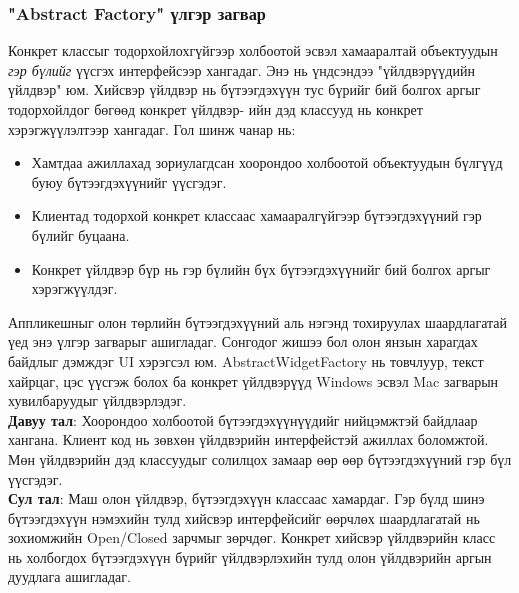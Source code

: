 \subsubsection{"Abstract Factory" үлгэр загвар}
\quad \quad Конкрет классыг тодорхойлохгүйгээр холбоотой эсвэл хамааралтай объектуудын \textit{гэр бүлийг} үүсгэх интерфейсээр хангадаг. Энэ нь үндсэндээ "үйлдвэрүүдийн үйлдвэр" юм. Хийсвэр үйлдвэр нь бүтээгдэхүүн тус бүрийг бий болгох аргыг тодорхойлдог бөгөөд конкрет үйлдвэр- ийн дэд классууд нь конкрет хэрэгжүүлэлтээр хангадаг. Гол шинж чанар нь:
\begin{itemize}
	\item Хамтдаа ажиллахад зориулагдсан хоорондоо холбоотой объектуудын бүлгүүд буюу бүтээгдэхүүнийг үүсгэдэг.
	\item Клиентад тодорхой конкрет классаас хамааралгүйгээр бүтээгдэхүүний гэр бүлийг буцаана.
	\item Конкрет үйлдвэр бүр нь гэр бүлийн бүх бүтээгдэхүүнийг бий болгох аргыг хэрэгжүүлдэг.
\end{itemize}
Аппликешныг олон төрлийн бүтээгдэхүүний аль нэгэнд тохируулах шаардлагатай үед энэ үлгэр загварыг ашигладаг. Сонгодог жишээ бол олон янзын харагдах байдлыг дэмждэг UI хэрэгсэл юм. AbstractWidgetFactory нь товчлуур, текст хайрцаг, цэс үүсгэж болох ба конкрет үйлдвэрүүд Windows эсвэл Mac загварын хувилбаруудыг үйлдвэрлэдэг.\\
\textbf{Давуу тал}: Хоорондоо холбоотой бүтээгдэхүүнүүдийг нийцэмжтэй байдлаар хангана. Клиент код нь зөвхөн үйлдвэрийн интерфейстэй ажиллах боломжтой. Мөн үйлдвэрийн дэд классуудыг солилцох замаар өөр өөр бүтээгдэхүүний гэр бүл үүсгэдэг. \\
\textbf{Сул тал}: Маш олон үйлдвэр, бүтээгдэхүүн классаас хамардаг. Гэр бүлд шинэ бүтээгдэхүүн нэмэхийн тулд хийсвэр интерфейсийг өөрчлөх шаардлагатай нь зохиомжийн Open/Closed зарчмыг зөрчдөг. Конкрет хийсвэр үйлдвэрийн класс нь холбогдох бүтээгдэхүүн бүрийг үйлдвэрлэхийн тулд олон үйлдвэрийн аргын дуудлага ашигладаг.

